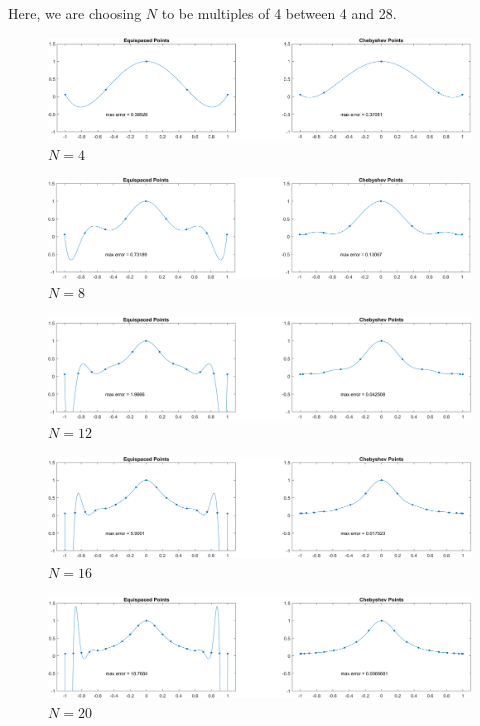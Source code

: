 \documentclass[12pt]{article}
\begin{document}
Here, we are choosing $N$ to be multiples of 4 between 4 and 28.\\
\begin{figure}[htp]
\centering
\includegraphics[scale=0.2]{5_14.PNG}
\caption{$N=4$}
\end{figure}
\begin{figure}[htp]
\centering
\includegraphics[scale=0.2]{5_18.PNG}
\caption{$N=8$}
\end{figure}
\begin{figure}[htp]
\centering
\includegraphics[scale=0.2]{5_112.PNG}
\caption{$N=12$}
\end{figure}
\begin{figure}[htp]
\centering
\includegraphics[scale=0.2]{5_116.PNG}
\caption{$N=16$}
\end{figure}
\begin{figure}[htp]
\centering
\includegraphics[scale=0.2]{5_120.PNG}
\caption{$N=20$}
\end{figure}
\end{document}
